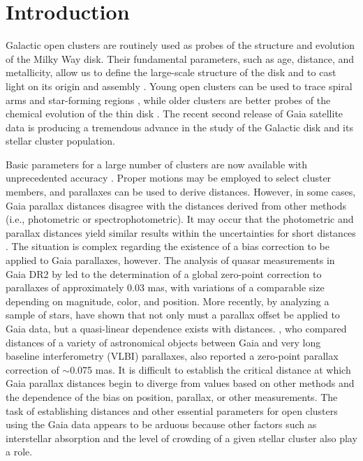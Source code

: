 \documentclass[draft]{aa}
\begin{document}
\section{Introduction}

Galactic open clusters are routinely used as probes of the structure and
evolution of the Milky Way disk. Their fundamental parameters, such as age,
distance, and metallicity, allow us to define the large-scale structure of the
disk and to cast light on its origin and assembly \citep{Janes_1982,
Moitinho_2010,2018A&A...618A..93C}. Young open clusters can be used to trace
spiral arms and star-forming regions \citep{Moitinho_2006,Vazquez2008}, while
older clusters are better probes of the chemical evolution of the thin disk
\citep{2009yCat..35120063M}. The recent second release of Gaia satellite data
\citep{GaiaDR2_2018} is producing a tremendous advance in the study of the
Galactic disk and its stellar cluster population.

Basic parameters for a large number of clusters are now available with
unprecedented accuracy \citep{2018A&A...618A..93C,Soubiran_2018,Bossini_2019,
Monteiro_2019}. Proper motions may be employed to select cluster members, and
parallaxes can be used to derive distances. However, in some cases, Gaia
parallax distances disagree with the distances derived from other methods 
(i.e., photometric or spectrophotometric). It may occur that the photometric and parallax distances yield similar results
within the uncertainties for short distances \citep{2018A&A...618A..93C}. The
situation is complex regarding the existence of a bias correction to be applied
to Gaia parallaxes, however. The analysis of quasar measurements in Gaia DR2 by
\cite{Lindegren_2018} led to the determination of a global zero-point
correction to parallaxes of approximately 0.03 mas, with variations of a
comparable size depending on magnitude, color, and position.
More recently, by analyzing a sample of stars, \cite{Schonrich2019} have shown
that not only must a parallax offset be applied to Gaia data, but a
quasi-linear dependence exists with distances.
\cite{Xu_2019}, who compared distances of a variety of astronomical objects
between Gaia and very long baseline interferometry (VLBI) parallaxes, also
reported a zero-point parallax correction of $\sim$0.075 mas.
It is difficult to establish the critical distance at which Gaia parallax
distances begin to diverge from values based on other methods and the dependence of
the bias on position, parallax, or other measurements. The  task of
establishing distances and other essential parameters for open clusters using
the Gaia data appears to be arduous because other factors such as interstellar
absorption and the level of crowding of a given stellar cluster also play a
role.
\end{document}
